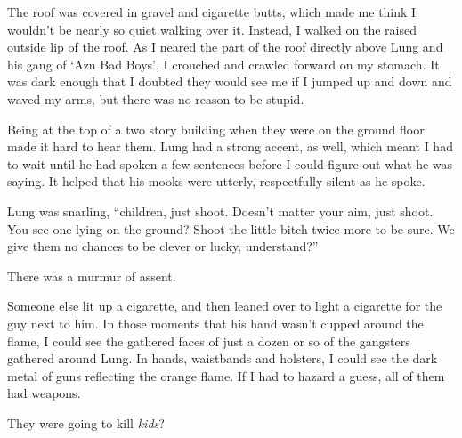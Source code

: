 The roof was covered in gravel and cigarette butts, which made me think I wouldn't be nearly so quiet walking over it.  Instead, I walked on the raised outside lip of the roof.  As I neared the part of the roof directly above Lung and his gang of `Azn Bad Boys', I crouched and crawled forward on my stomach.  It was dark enough that I doubted they would see me if I jumped up and down and waved my arms, but there was no reason to be stupid.



Being at the top of a two story building when they were on the ground floor made it hard to hear them.  Lung had a strong accent, as well, which meant I had to wait until he had spoken a few sentences before I could figure out what he was saying.  It helped that his mooks were utterly, respectfully silent as he spoke.



Lung was snarling, ``\ldotsthe children, just shoot.  Doesn't matter your aim, just shoot.  You see one lying on the ground?  Shoot the little bitch twice more to be sure.  We give them no chances to be clever or lucky, understand?''



There was a murmur of assent.



Someone else lit up a cigarette, and then leaned over to light a cigarette for the guy next to him.  In those moments that his hand wasn't cupped around the flame, I could see the gathered faces of just a dozen or so of the gangsters gathered around Lung.  In hands, waistbands and holsters, I could see the dark metal of guns reflecting the orange flame.  If I had to hazard a guess, all of them had weapons.



They were going to kill \emph{kids}?





